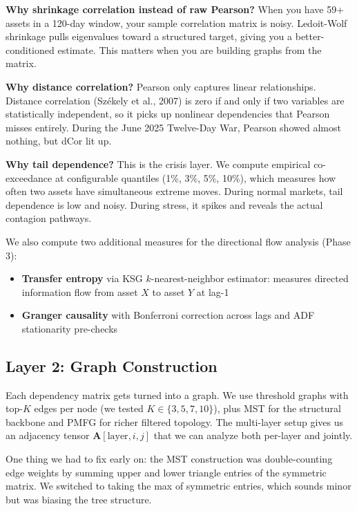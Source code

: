 \documentclass[12pt, letterpaper]{article}
\begin{document}
\textbf{Why shrinkage correlation instead of raw Pearson?} When you have 59+ assets in a 120-day window, your sample correlation matrix is noisy. Ledoit-Wolf shrinkage pulls eigenvalues toward a structured target, giving you a better-conditioned estimate. This matters when you are building graphs from the matrix.

\textbf{Why distance correlation?} Pearson only captures linear relationships. Distance correlation (Sz\'{e}kely et al., 2007) is zero if and only if two variables are statistically independent, so it picks up nonlinear dependencies that Pearson misses entirely. During the June 2025 Twelve-Day War, Pearson showed almost nothing, but dCor lit up.

\textbf{Why tail dependence?} This is the crisis layer. We compute empirical co-exceedance at configurable quantiles (1\%, 3\%, 5\%, 10\%), which measures how often two assets have simultaneous extreme moves. During normal markets, tail dependence is low and noisy. During stress, it spikes and reveals the actual contagion pathways.

We also compute two additional measures for the directional flow analysis (Phase 3):

\begin{itemize}
    \item \textbf{Transfer entropy} via KSG $k$-nearest-neighbor estimator: measures directed information flow from asset $X$ to asset $Y$ at lag-1
    \item \textbf{Granger causality} with Bonferroni correction across lags and ADF stationarity pre-checks
\end{itemize}

\subsection{Layer 2: Graph Construction}

Each dependency matrix gets turned into a graph. We use threshold graphs with top-$K$ edges per node (we tested $K \in \{3, 5, 7, 10\}$), plus MST for the structural backbone and PMFG for richer filtered topology. The multi-layer setup gives us an adjacency tensor $\mathbf{A}[\text{layer}, i, j]$ that we can analyze both per-layer and jointly.

One thing we had to fix early on: the MST construction was double-counting edge weights by summing upper and lower triangle entries of the symmetric matrix. We switched to taking the max of symmetric entries, which sounds minor but was biasing the tree structure.
\end{document}

